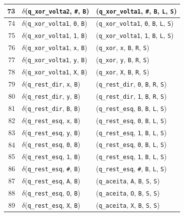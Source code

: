 \documentclass[report, 12pt]{uftreport}
\begin{document}
{\begin{longtable}{r l l}
73 & $\delta$(\texttt{q\_xor\_volta2}, \texttt{\#}, \texttt{B}) & (\texttt{q\_xor\_volta1}, \texttt{\#}, \texttt{B}, \texttt{L}, \texttt{S}) \\
\midrule
74 & $\delta$(\texttt{q\_xor\_volta1}, \texttt{0}, \texttt{B}) & (\texttt{q\_xor\_volta1}, \texttt{0}, \texttt{B}, \texttt{L}, \texttt{S}) \\
75 & $\delta$(\texttt{q\_xor\_volta1}, \texttt{1}, \texttt{B}) & (\texttt{q\_xor\_volta1}, \texttt{1}, \texttt{B}, \texttt{L}, \texttt{S}) \\
76 & $\delta$(\texttt{q\_xor\_volta1}, \texttt{x}, \texttt{B}) & (\texttt{q\_xor}, \texttt{x}, \texttt{B}, \texttt{R}, \texttt{S}) \\
77 & $\delta$(\texttt{q\_xor\_volta1}, \texttt{y}, \texttt{B}) & (\texttt{q\_xor}, \texttt{y}, \texttt{B}, \texttt{R}, \texttt{S}) \\
78 & $\delta$(\texttt{q\_xor\_volta1}, \texttt{X}, \texttt{B}) & (\texttt{q\_xor}, \texttt{X}, \texttt{B}, \texttt{R}, \texttt{S}) \\
\midrule
79 & $\delta$(\texttt{q\_rest\_dir}, \texttt{x}, \texttt{B}) & (\texttt{q\_rest\_dir}, \texttt{0}, \texttt{B}, \texttt{R}, \texttt{S}) \\
80 & $\delta$(\texttt{q\_rest\_dir}, \texttt{y}, \texttt{B}) & (\texttt{q\_rest\_dir}, \texttt{1}, \texttt{B}, \texttt{R}, \texttt{S}) \\
81 & $\delta$(\texttt{q\_rest\_dir}, \texttt{B}, \texttt{B}) & (\texttt{q\_rest\_esq}, \texttt{B}, \texttt{B}, \texttt{L}, \texttt{S}) \\
\midrule
82 & $\delta$(\texttt{q\_rest\_esq}, \texttt{x}, \texttt{B}) & (\texttt{q\_rest\_esq}, \texttt{0}, \texttt{B}, \texttt{L}, \texttt{S}) \\
83 & $\delta$(\texttt{q\_rest\_esq}, \texttt{y}, \texttt{B}) & (\texttt{q\_rest\_esq}, \texttt{1}, \texttt{B}, \texttt{L}, \texttt{S}) \\
84 & $\delta$(\texttt{q\_rest\_esq}, \texttt{0}, \texttt{B}) & (\texttt{q\_rest\_esq}, \texttt{0}, \texttt{B}, \texttt{L}, \texttt{S}) \\
85 & $\delta$(\texttt{q\_rest\_esq}, \texttt{1}, \texttt{B}) & (\texttt{q\_rest\_esq}, \texttt{1}, \texttt{B}, \texttt{L}, \texttt{S}) \\
86 & $\delta$(\texttt{q\_rest\_esq}, \texttt{\#}, \texttt{B}) & (\texttt{q\_rest\_esq}, \texttt{\#}, \texttt{B}, \texttt{L}, \texttt{S}) \\
87 & $\delta$(\texttt{q\_rest\_esq}, \texttt{A}, \texttt{B}) & (\texttt{q\_aceita}, \texttt{A}, \texttt{B}, \texttt{S}, \texttt{S}) \\
88 & $\delta$(\texttt{q\_rest\_esq}, \texttt{O}, \texttt{B}) & (\texttt{q\_aceita}, \texttt{O}, \texttt{B}, \texttt{S}, \texttt{S}) \\
89 & $\delta$(\texttt{q\_rest\_esq}, \texttt{X}, \texttt{B}) & (\texttt{q\_aceita}, \texttt{X}, \texttt{B}, \texttt{S}, \texttt{S}) \\
\end{longtable}
}
\end{document}
